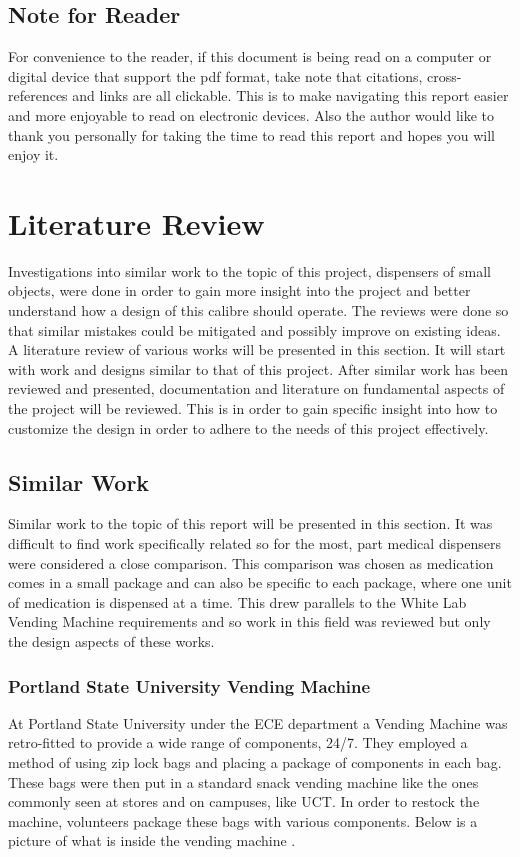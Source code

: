 \documentclass[a4paper,11pt]{article}
\numberwithin{figure}{section}
\numberwithin{table}{section}
\begin{document}
	\subsection{Note for Reader}
	For convenience to the reader, if this document is being read on a computer or digital device that support the pdf format, take note that citations, cross-references and links are all clickable. This is to make navigating this report easier and more enjoyable to read on electronic devices. Also the author would like to thank you personally for taking the time to read this report and hopes you will enjoy it.
	\newpage
\setlength{\parskip}{1em}
\section{Literature Review}
Investigations into similar work to the topic of this project, dispensers of small objects, were done in order to gain more insight into the project and better understand how a design of this calibre should operate. The reviews were done so that similar mistakes could be mitigated and possibly improve on existing ideas. A literature review of various works will be presented in this section. It will start with work and designs similar to that of this project. After similar work has been reviewed and presented, documentation and literature on fundamental aspects of the project will be reviewed. This is in order to gain specific insight into how to customize the design in order to adhere to the needs of this project effectively. 
\subsection{Similar Work}
Similar work to the topic of this report will be presented in this section. It was difficult to find work specifically related so for the most, part medical dispensers were considered a close comparison. This comparison was chosen as medication comes in a small package and can also be specific to each package, where one unit of medication is dispensed at a time. This drew parallels to the White Lab Vending Machine requirements and so work in this field was reviewed but only the design aspects of these works.

\subsubsection{Portland State University Vending Machine}
At Portland State University under the ECE department a Vending Machine was retro-fitted to provide a wide range of components, 24/7. They employed a method of using zip lock bags and placing a package of components in each bag. These bags were then put in a standard snack vending machine like the ones commonly seen at stores and on campuses, like UCT. In order to restock the machine, volunteers package these bags with various components. Below is a picture of what is inside the vending machine \cite{PORTU,vend}.
\end{document}
